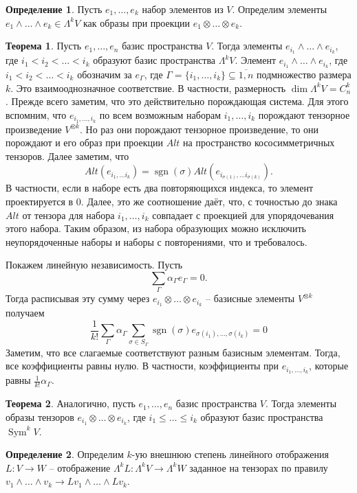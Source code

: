 \documentclass[10pt,a4paper,oneside]{book}
\theoremstyle{definition}
\newtheorem*{defn}{\color{yellow!30!red} Определение}
\newtheorem{thm}{\color{red!40!black}Теорема}
\renewcommand{\leq}{\leqslant}
\newcommand{\ovl}{\overline}
\newcommand{\Sym}{\operatorname{Sym}}
\newcommand{\sgn}{\operatorname{sgn}}
\def\thrm{\begin{thm}}
\def\ethrm{\end{thm}}
\def\dfn{\begin{defn}}
\def\edfn{\end{defn}}
\begin{document}
\dfn Пусть $e_1,\dots, e_k$ набор элементов из $V$. Определим элементы $e_1\wedge \dots \wedge e_k \in \Lambda^k V$ как образы при проекции $e_1\otimes \dots \otimes e_k$.
\edfn

\thrm Пусть $e_1,\dots, e_n$ базис пространства $V$. Тогда элементы $e_{i_1}\wedge \dots \wedge e_{i_k}$, где $i_1<i_2< \dots < i_k$ образуют базис пространства $\Lambda^k V$. Элемент $e_{i_1}\wedge \dots \wedge e_{i_k}$, где $i_1<i_2< \dots < i_k$  обозначим за $e_{\Gamma}$, где $\Gamma =\{i_1,\dots,i_k\}\subseteq \ovl{1,n}$ подмножество размера $k$. Это взаимооднозначное соответствие. В частности, размерность $\dim \Lambda^k V = C^k_n$. 
\proof Прежде всего заметим, что это действительно порождающая система. Для этого вспомним, что $e_{i_1,\dots,i_k}$ по всем возможным наборам $i_1,\dots,i_k$ порождают тензорное произведение $V^{\otimes k}$. Но раз они порождают тензорное произведение, то они порождают и его образ при проекции $Alt$ на пространство кососимметричных тензоров. Далее заметим, что $$Alt(e_{i_1,\dots i_k})= \sgn(\sigma) Alt(e_{i_{\sigma(1)},\dots i_{\sigma(k)}}).$$
В частности, если в наборе есть два повторяющихся индекса, то элемент проектируется в 0. Далее, это же соотношение даёт, что,  с точностью до знака $Alt$ от тензора для набора $i_1,\dots,i_k$ совпадает с проекцией для упорядочевания этого набора. Таким образом, из набора образующих можно исключить неупорядоченные наборы и наборы с повторениями, что и требовалось.

\noindent Покажем линейную независимость. Пусть  
$$\sum_{\Gamma} \alpha_{\Gamma} e_{\Gamma}=0.$$
Тогда расписывая эту сумму через $e_{i_1}\otimes \dots \otimes e_{i_k}$ -- базисные элементы $V^{\otimes k}$ получаем
$$\frac{1}{k!}\sum_{\Gamma} \alpha_{\Gamma} \sum_{\sigma \in S_{\Gamma}} \sgn(\sigma) e_{\sigma(i_1),\dots,\sigma(i_k)} =0 $$
Заметим, что все слагаемые соответствуют разным базисным элементам. Тогда, все коэффициенты равны нулю. В частности, коэффициенты при $ e_{i_1, \dots, i_k}$, которые равны $\frac{1}{k!}\alpha_{\Gamma}$. 

\endproof
\ethrm

\thrm Аналогично, пусть $e_1,\dots, e_n$ базис пространства $V$. Тогда элементы образы тензоров $e_{i_1}\otimes \dots \otimes e_{i_k}$, где $i_1\leq \dots \leq i_k$ образуют базис пространства $\Sym^k V$.
\ethrm

\dfn Определим $k$-ую внешнюю степень линейного отображения $L\colon V \to W$ -- отображение $\Lambda^{k} L  \colon \Lambda^k V \to \Lambda^k W$ заданное на тензорах по правилу $v_1\wedge \dots \wedge v_k \to L v_1 \wedge \dots \wedge L v_k$. 
\edfn
\end{document}
